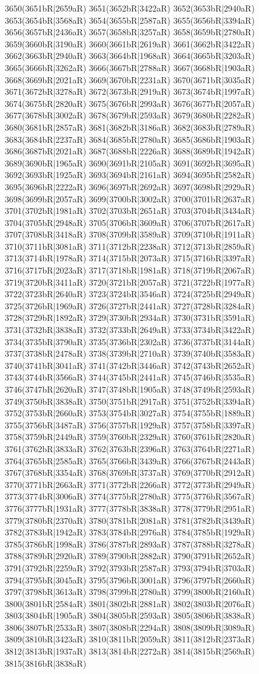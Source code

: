 3650(3651bR|2659aR) 3651(3652bR|3422aR) 3652(3653bR|2940aR) 3653(3654bR|3568aR) 3654(3655bR|2587aR) 3655(3656bR|3394aR) 3656(3657bR|2436aR) 3657(3658bR|3257aR) 3658(3659bR|2780aR) 3659(3660bR|3190aR) 3660(3661bR|2619aR) 3661(3662bR|3422aR) 3662(3663bR|2940aR) 3663(3664bR|1968aR) 3664(3665bR|3203aR) 3665(3666bR|3262aR) 3666(3667bR|2788aR) 3667(3668bR|1903aR) 3668(3669bR|2021aR) 3669(3670bR|2231aR) 3670(3671bR|3035aR) 3671(3672bR|3278aR) 3672(3673bR|2919aR) 3673(3674bR|1997aR) 3674(3675bR|2820aR) 3675(3676bR|2993aR) 3676(3677bR|2057aR) 3677(3678bR|3002aR) 3678(3679bR|2593aR) 3679(3680bR|2282aR) 3680(3681bR|2857aR) 3681(3682bR|3186aR) 3682(3683bR|2789aR) 3683(3684bR|2237aR) 3684(3685bR|2780aR) 3685(3686bR|1903aR) 3686(3687bR|2021aR) 3687(3688bR|2226aR) 3688(3689bR|1942aR) 3689(3690bR|1965aR) 3690(3691bR|2105aR) 3691(3692bR|3695aR) 3692(3693bR|1925aR) 3693(3694bR|2161aR) 3694(3695bR|2582aR) 3695(3696bR|2222aR) 3696(3697bR|2692aR) 3697(3698bR|2929aR) 3698(3699bR|2057aR) 3699(3700bR|3002aR) 3700(3701bR|2637aR) 3701(3702bR|1981aR) 3702(3703bR|2651aR) 3703(3704bR|3434aR) 3704(3705bR|2948aR) 3705(3706bR|3609aR) 3706(3707bR|2617aR) 3707(3708bR|3418aR) 3708(3709bR|3589aR) 3709(3710bR|1911aR) 3710(3711bR|3081aR) 3711(3712bR|2238aR) 3712(3713bR|2859aR) 3713(3714bR|1978aR) 3714(3715bR|2073aR) 3715(3716bR|3397aR) 3716(3717bR|2023aR) 3717(3718bR|1981aR) 3718(3719bR|2067aR) 3719(3720bR|3411aR) 3720(3721bR|2057aR) 3721(3722bR|1977aR) 3722(3723bR|2640aR) 3723(3724bR|3546aR) 3724(3725bR|2949aR) 3725(3726bR|1969aR) 3726(3727bR|2441aR) 3727(3728bR|3284aR) 3728(3729bR|1892aR) 3729(3730bR|2934aR) 3730(3731bR|3591aR) 3731(3732bR|3838aR) 3732(3733bR|2649aR) 3733(3734bR|3422aR) 3734(3735bR|3790aR) 3735(3736bR|2302aR) 3736(3737bR|3144aR) 3737(3738bR|2478aR) 3738(3739bR|2710aR) 3739(3740bR|3583aR) 3740(3741bR|3041aR) 3741(3742bR|3446aR) 3742(3743bR|2652aR) 3743(3744bR|3566aR) 3744(3745bR|2441aR) 3745(3746bR|3535aR) 3746(3747bR|2620aR) 3747(3748bR|1905aR) 3748(3749bR|2593aR) 3749(3750bR|3838aR) 3750(3751bR|2917aR) 3751(3752bR|3394aR) 3752(3753bR|2660aR) 3753(3754bR|3027aR) 3754(3755bR|1889aR) 3755(3756bR|3487aR) 3756(3757bR|1929aR) 3757(3758bR|3397aR) 3758(3759bR|2449aR) 3759(3760bR|2329aR) 3760(3761bR|2820aR) 3761(3762bR|3833aR) 3762(3763bR|2396aR) 3763(3764bR|2271aR) 3764(3765bR|2585aR) 3765(3766bR|3439aR) 3766(3767bR|2443aR) 3767(3768bR|3354aR) 3768(3769bR|3737aR) 3769(3770bR|2912aR) 3770(3771bR|2663aR) 3771(3772bR|2266aR) 3772(3773bR|2949aR) 3773(3774bR|3006aR) 3774(3775bR|2780aR) 3775(3776bR|3567aR) 3776(3777bR|1931aR) 3777(3778bR|3838aR) 3778(3779bR|2951aR) 3779(3780bR|2370aR) 3780(3781bR|2081aR) 3781(3782bR|3439aR) 3782(3783bR|1942aR) 3783(3784bR|2976aR) 3784(3785bR|1929aR) 3785(3786bR|1998aR) 3786(3787bR|2893aR) 3787(3788bR|3278aR) 3788(3789bR|2920aR) 3789(3790bR|2882aR) 3790(3791bR|2652aR) 3791(3792bR|2259aR) 3792(3793bR|2587aR) 3793(3794bR|3703aR) 3794(3795bR|3045aR) 3795(3796bR|3001aR) 3796(3797bR|2660aR) 3797(3798bR|3613aR) 3798(3799bR|2780aR) 3799(3800bR|2160aR) 3800(3801bR|2584aR) 3801(3802bR|2881aR) 3802(3803bR|2076aR) 3803(3804bR|1905aR) 3804(3805bR|2593aR) 3805(3806bR|3838aR) 3806(3807bR|2533aR) 3807(3808bR|2294aR) 3808(3809bR|3089aR) 3809(3810bR|3423aR) 3810(3811bR|2059aR) 3811(3812bR|2373aR) 3812(3813bR|1937aR) 3813(3814bR|2272aR) 3814(3815bR|2569aR) 3815(3816bR|3838aR) 